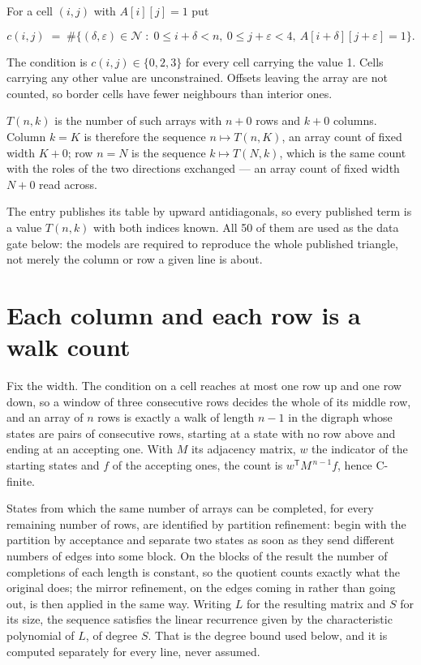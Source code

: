 \documentclass[11pt]{article}
\theoremstyle{definition}
\begin{document}
For a cell $(i,j)$ with $A[i][j] = 1$ put

\[c(i,j) \;=\; \#\bigl\{(\delta,\varepsilon)\in\mathcal{N} \;:\; 0\le i+\delta<n,\ 0\le j+\varepsilon<4,\ A[i+\delta][j+\varepsilon] = 1\bigr\}.\]

The condition is $c(i,j) \in \{0, 2, 3\}$ for every cell carrying the value 1. Cells carrying any other value are unconstrained. Offsets leaving the array are not counted, so border cells have fewer neighbours than interior ones.

$T(n,k)$ is the number of such arrays with $n + 0$ rows and $k + 0$ columns. Column $k = K$ is therefore the sequence $n \mapsto T(n,K)$, an array count of fixed width $K + 0$; row $n = N$ is the sequence $k \mapsto T(N,k)$, which is the same count with the roles of the two directions exchanged --- an array count of fixed width $N + 0$ read across.

The entry publishes its table by upward antidiagonals, so every published term is a value $T(n,k)$ with both indices known. All 50 of them are used as the data gate below: the models are required to reproduce the whole published triangle, not merely the column or row a given line is about.

\section{Each column and each row is a walk count}

Fix the width. The condition on a cell reaches at most one row up and one row down, so a window of three consecutive rows decides the whole of its middle row, and an array of $n$ rows is exactly a walk of length $n-1$ in the digraph whose states are pairs of consecutive rows, starting at a state with no row above and ending at an accepting one. With $M$ its adjacency matrix, $w$ the indicator of the starting states and $f$ of the accepting ones, the count is $w^{\mathsf T}M^{\,n-1}f$, hence C-finite.

States from which the same number of arrays can be completed, for every remaining number of rows, are identified by partition refinement: begin with the partition by acceptance and separate two states as soon as they send different numbers of edges into some block. On the blocks of the result the number of completions of each length is constant, so the quotient counts exactly what the original does; the mirror refinement, on the edges coming in rather than going out, is then applied in the same way. Writing $L$ for the resulting matrix and $S$ for its size, the sequence satisfies the linear recurrence given by the characteristic polynomial of $L$, of degree $S$. That is the degree bound used below, and it is computed separately for every line, never assumed.
\end{document}
